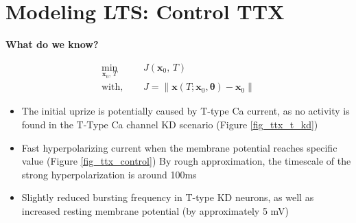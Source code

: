 \documentclass[11pt]{article}
\begin{document}
\section{Modeling LTS: Control TTX}

\textbf{What do we know?}

\begin{align}
    \min_{\mathbf{x}_0,\, T} & \quad J({\mathbf{x}_0,\, T})\\
    \text{with, } & \quad J = \left\| \mathbf{x}(T; \mathbf{x}_0 ,\boldsymbol\theta) - \mathbf{x}_0 \right\|
\end{align}

\begin{itemize}
    \item The initial uprize is potentially caused by T-type Ca current, as no activity
    is found in the T-Type Ca channel KD scenario (Figure \ref{fig_ttx_t_kd})
    
    \item Fast hyperpolarizing current when the membrane potential reaches specific value (Figure \ref{fig_ttx_control})
    By rough approximation, the timescale of the strong hyperpolarization is around 100ms
    
    \item Slightly reduced bursting frequency in T-type KD neurons, as well as increased resting membrane
    potential (by approximately 5 mV)


\end{itemize}
\end{document}
